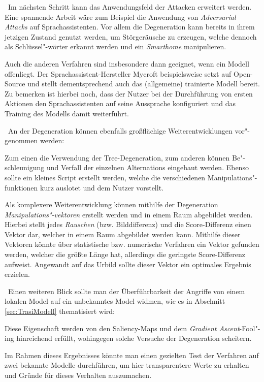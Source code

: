 ~\newline Im nächsten Schritt kann das Anwendungsfeld der Attacken erweitert werden. 
Eine spannende Arbeit wäre zum Beispiel die Anwendung von \textit{Adversarial Attacks} auf Sprachassistenten. 
Vor allem die Degeneration kann bereits in ihrem jetzigen Zustand genutzt werden, um Störgeräusche zu erzeugen, welche dennoch als Schlüssel"-wörter erkannt werden und ein \textit{Smarthome} manipulieren. 

Auch die anderen Verfahren sind insbesondere dann geeignet, wenn ein Modell offenliegt. 
Der Sprachassistent-Hersteller Mycroft beispielsweise setzt auf Open-Source und stellt dementsprechend auch das (allgemeine) trainierte Modell bereit. 
Zu bemerken ist hierbei noch, dass der Nutzer bei der Durchführung von ersten Aktionen den Sprachassistenten auf seine Aussprache konfiguriert und das Training des Modells damit weiterführt.  

~\newline An der Degeneration können ebenfalls großflächige Weiterentwicklungen vor"-genommen werden: 

Zum einen die Verwendung der Tree-Degeneration, zum anderen können Be"-schleunigung und Verfall der einzelnen Alternations eingebaut werden. 
Ebenso sollte ein kleines Script erstellt werden, welche die verschiedenen Manipulations"-funktionen kurz auslotet und dem Nutzer vorstellt. 

Als komplexere Weiterentwicklung können mithilfe der Degeneration \textit{Manipulations"-vektoren} erstellt werden und in einem Raum abgebildet werden. 
Hierbei stellt jedes \textit{Rauschen} (bzw. Bilddifferenz) und die Score-Differenz einen Vektor dar, welcher in einem Raum abgebildet werden kann. 
Mithilfe dieser Vektoren könnte über statistische bzw. numerische Verfahren ein Vektor gefunden werden, welcher die größte Länge hat, allerdings die geringste Score-Differenz aufweist. 
Angewandt auf das Urbild sollte dieser Vektor ein optimales Ergebnis erzielen.  

~\newline Einen weiteren Blick sollte man der Überführbarkeit der Angriffe von einem lokalen Model auf ein unbekanntes Model widmen, wie es in Abschnitt \ref{sec:TrasiModell} thematisiert wird: 

Diese Eigenschaft werden von den Saliency-Maps und dem \textit{Gradient Ascent}-Fool"-ing hinreichend erfüllt, wohingegen solche Versuche der Degeneration scheitern. 

Im Rahmen dieses Ergebnisses könnte man einen gezielten Test der Verfahren auf zwei bekannte Modelle durchführen, um hier transparentere Werte zu erhalten und Gründe für dieses Verhalten auszumachen. 